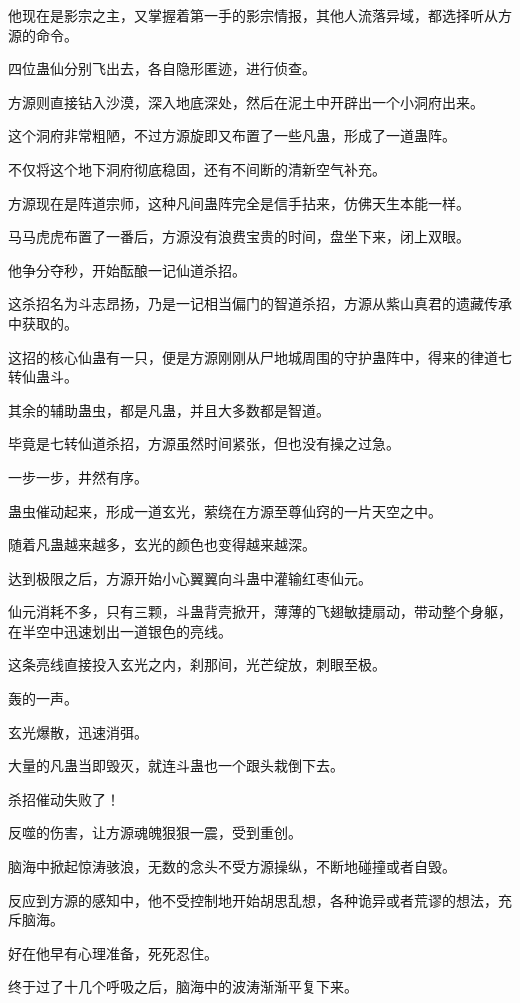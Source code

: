 \begin{this_body}
他现在是影宗之主，又掌握着第一手的影宗情报，其他人流落异域，都选择听从方源的命令。

四位蛊仙分别飞出去，各自隐形匿迹，进行侦查。

方源则直接钻入沙漠，深入地底深处，然后在泥土中开辟出一个小洞府出来。

这个洞府非常粗陋，不过方源旋即又布置了一些凡蛊，形成了一道蛊阵。

不仅将这个地下洞府彻底稳固，还有不间断的清新空气补充。

方源现在是阵道宗师，这种凡间蛊阵完全是信手拈来，仿佛天生本能一样。

马马虎虎布置了一番后，方源没有浪费宝贵的时间，盘坐下来，闭上双眼。

他争分夺秒，开始酝酿一记仙道杀招。

这杀招名为斗志昂扬，乃是一记相当偏门的智道杀招，方源从紫山真君的遗藏传承中获取的。

这招的核心仙蛊有一只，便是方源刚刚从尸地城周围的守护蛊阵中，得来的律道七转仙蛊斗。

其余的辅助蛊虫，都是凡蛊，并且大多数都是智道。

毕竟是七转仙道杀招，方源虽然时间紧张，但也没有操之过急。

一步一步，井然有序。

蛊虫催动起来，形成一道玄光，萦绕在方源至尊仙窍的一片天空之中。

随着凡蛊越来越多，玄光的颜色也变得越来越深。

达到极限之后，方源开始小心翼翼向斗蛊中灌输红枣仙元。

仙元消耗不多，只有三颗，斗蛊背壳掀开，薄薄的飞翅敏捷扇动，带动整个身躯，在半空中迅速划出一道银色的亮线。

这条亮线直接投入玄光之内，刹那间，光芒绽放，刺眼至极。

轰的一声。

玄光爆散，迅速消弭。

大量的凡蛊当即毁灭，就连斗蛊也一个跟头栽倒下去。

杀招催动失败了！

反噬的伤害，让方源魂魄狠狠一震，受到重创。

脑海中掀起惊涛骇浪，无数的念头不受方源操纵，不断地碰撞或者自毁。

反应到方源的感知中，他不受控制地开始胡思乱想，各种诡异或者荒谬的想法，充斥脑海。

好在他早有心理准备，死死忍住。

终于过了十几个呼吸之后，脑海中的波涛渐渐平复下来。


\end{this_body}
